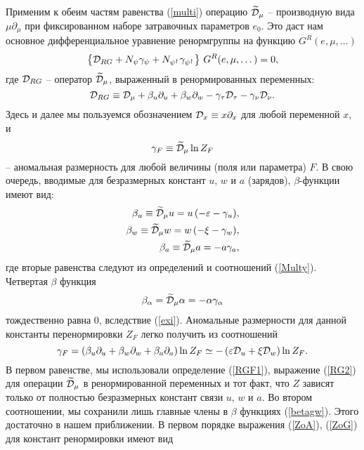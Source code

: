 \documentclass[a4paper,10pt]{article}
\def\Dm{\widetilde{\cal D}_{\mu}}
\def\D{{\cal D}}
\def\Dm{\widetilde{\cal D}_{\mu}}
\def\D{{\cal D}}
\begin{document}
Применим к обеим частям равенства (\ref{multi}) операцию
$\widetilde{\cal D}_{\mu}$ -- производную вида $\mu\partial_{\mu}$
при фиксированном наборе затравочных параметров $e_{0}$.
Это даст нам основное
дифференциальное уравнение ренормгруппы на функцию
$G^{R}(e,\mu,\dots)$
\begin{equation}
\left\{ {\cal D}_{RG} + N_{\psi}\gamma_{\psi} +
N_{\psi^{\dagger}}\gamma_{\psi^{\dagger}} \right\}
\,G^{R}(e,\mu,\dots) = 0, \label{RG1}
\end{equation}
где ${\cal D}_{RG}$ -- оператор  $\widetilde{\cal D}_{\mu}$,
выраженный в ренормированных переменных:
\begin{equation}
{\cal D}_{RG}\equiv {\cal D}_{\mu} + \beta_{u}\partial_{u} +
\beta_{w}\partial_{w} - \gamma_{\tau}{\cal D}_{\tau} -
\gamma_{\nu}{\cal D}_{\nu}.
\label{RG2}
\end{equation}
Здесь и далее мы пользуемся обозначением ${\cal D}_{x}\equiv
x\partial_{x}$ для любой переменной $x$, и
\begin{equation}
\gamma_{F}\equiv \widetilde{\cal D}_{\mu }\ln Z_{F}
\label{RGF1}
\end{equation}
-- аномальная размерность для любой величины (поля или параметра) $F$. 
 В свою очередь, вводимые для безразмерных констант
$u$, $w$ и $a$ (зарядов), $\beta$-функции имеют вид:
\begin{eqnarray}
\beta_{u} \equiv \widetilde {\cal D}_{\mu} u = u\, (-\varepsilon-\gamma_{u}),
\nonumber \\
\beta_{w} \equiv \widetilde {\cal D}_{\mu} w = w\,(-\xi-\gamma_{w}),
\nonumber \\
\beta_{a} \equiv \widetilde {\cal D}_{\mu} a = -a\gamma_{a},
\label{betagw}
\end{eqnarray}
где вторые равенства следуют из определений и соотношений (\ref{Multy}).
Четвертая $\beta$ функция
\begin{eqnarray}
\beta_{\alpha}=\widetilde{\cal D}_{\mu}\alpha=-\alpha\gamma_{\alpha}
\label{Bal}
\end{eqnarray}
тождественно равна $0$, вследствие (\ref{exi}).
Аномальные размерности для данной константы перенормировки $Z_{F}$  легко получить из соотношений
 \begin{equation}
\gamma_{F} = \left( \beta_{u}\partial_{u}+\beta_{w}\partial_{w}
+\beta_{a}\partial_{a} \right)
\ln Z_{F} \simeq  - \left(\varepsilon\D_{u}+\xi\D_{w}\right) \ln Z_{F}.
\label{GfZ}
\end{equation}
В первом равенстве, мы использовали определение  (\ref{RGF1}), выражение (\ref{RG2})
для операции $\Dm$  в ренормированной переменных и тот факт, что $Z$ зависят
только от полностью безразмерных констант связи $u$, $w$ и $a$.
Во втором  соотношении, мы сохранили лишь главные члены в  $\beta$ функциях (\ref{betagw}). Этого достаточно в нашем приближении.
В первом порядке выражения (\ref{ZoA}), (\ref{ZoG}) для констант ренормировки имеют вид
\end{document}
